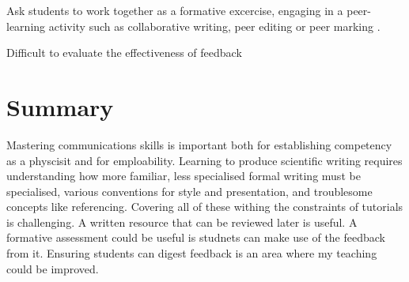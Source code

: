 Ask students to work together as a formative excercise, engaging in a peer-learning activity such as collaborative writing, peer editing or peer marking \citep[chapter 1]{Falchikov2001}.

Difficult to evaluate the effectiveness of feedback \citep{Price2010}

\section{Summary}

Mastering communications skills is important both for establishing competency as a physcisit and for emploability. Learning to produce scientific writing requires understanding how more familiar, less specialised formal writing must be specialised, various conventions for style and presentation, and troublesome concepts like referencing. Covering all of these withing the constraints of tutorials is challenging. A written resource that can be reviewed later is useful. A formative assessment could be useful is studnets can make use of the feedback from it. Ensuring students can digest feedback is an area where my teaching could be improved.
